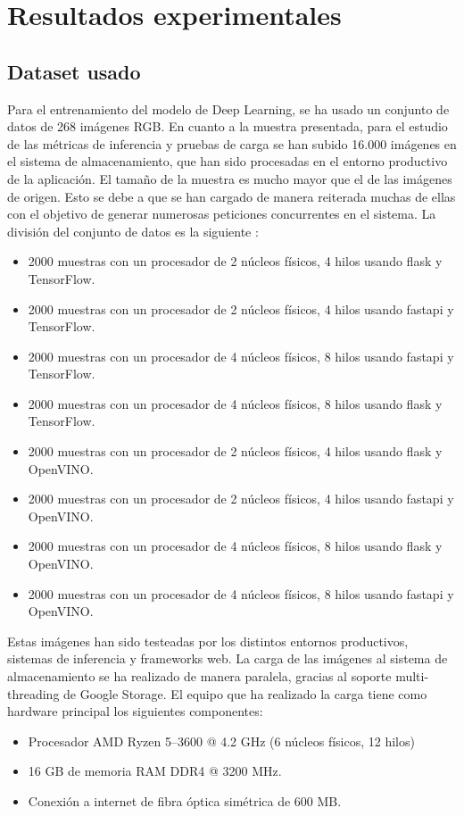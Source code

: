 \mbox{}
\usepackage{tabularx}
\usepackage{graphicx}
\usepackage{adjustbox}

\chapter{Resultados experimentales}
\label{ch:chapte5}


\section{Dataset usado}\label{sec:dataset-usado}
Para el entrenamiento del modelo de Deep Learning, se ha usado un conjunto de datos de 268 imágenes RGB\@.
En cuanto a la muestra presentada, para el estudio de las métricas de inferencia y pruebas de carga se han subido 16.000 imágenes en el sistema de almacenamiento, que han sido procesadas en el entorno productivo de la aplicación.
El tamaño de la muestra es mucho mayor que el de las imágenes de origen.
Esto se debe a que se han cargado de manera reiterada muchas de ellas con el objetivo de generar numerosas peticiones concurrentes en el sistema. La división del conjunto de datos es la siguiente :
\begin{itemize}
    \item 2000 muestras con un procesador de 2 núcleos físicos, 4 hilos usando flask y TensorFlow.
    \item 2000 muestras con un procesador de 2 núcleos físicos, 4 hilos usando fastapi y TensorFlow.
    \item 2000 muestras con un procesador de 4 núcleos físicos, 8 hilos usando fastapi y TensorFlow.
    \item 2000 muestras con un procesador de 4 núcleos físicos, 8 hilos usando flask y TensorFlow.
    \item 2000 muestras con un procesador de 2 núcleos físicos, 4 hilos usando flask y OpenVINO\@.
    \item 2000 muestras con un procesador de 2 núcleos físicos, 4 hilos usando fastapi y OpenVINO\@.
    \item 2000 muestras con un procesador de 4 núcleos físicos, 8 hilos usando flask y OpenVINO\@.
    \item 2000 muestras con un procesador de 4 núcleos físicos, 8 hilos usando fastapi y OpenVINO\@.
\end{itemize}

Estas imágenes han sido testeadas por los distintos entornos productivos, sistemas de inferencia y frameworks web.
La carga de las imágenes al sistema de almacenamiento se ha realizado de manera paralela, gracias al soporte multi-threading de Google Storage.
El equipo que ha realizado la carga tiene como hardware principal los siguientes componentes:
\begin{itemize}
    \item Procesador AMD Ryzen 5--3600 @ 4.2 GHz (6 núcleos físicos, 12 hilos)
    \item 16 GB de memoria RAM DDR4 @ 3200 MHz.
    \item Conexión a internet de fibra óptica simétrica de 600 MB\@.
\end{itemize}


